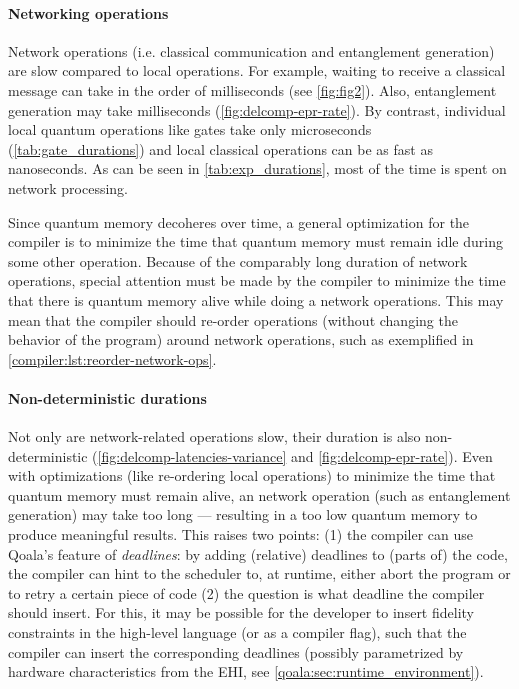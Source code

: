 \paragraph{Networking operations}
Network operations (i.e. classical communication and entanglement generation) are slow compared to local operations.
For example, waiting to receive a classical message can take in the order of milliseconds (see \cref{fig:fig2}).
Also, entanglement generation may take milliseconds (\cref{fig:delcomp-epr-rate}).
By contrast, individual local quantum operations like gates take only microseconds (\cref{tab:gate_durations}) and local classical operations can be as fast as nanoseconds.
As can be seen in \cref{tab:exp_durations}, most of the time is spent on network processing.

Since quantum memory decoheres over time, a general optimization for the compiler is to minimize the time that quantum memory must remain idle during some other operation.
Because of the comparably long duration of network operations, special attention must be made by the compiler to minimize the time that there is quantum memory alive while doing a network operations.
This may mean that the compiler should re-order operations (without changing the behavior of the program) around network operations, such as exemplified in \cref{compiler:lst:reorder-network-ops}.

\paragraph{Non-deterministic durations}
Not only are network-related operations slow, their duration is also non-deterministic (\cref{fig:delcomp-latencies-variance} and \cref{fig:delcomp-epr-rate}).
Even with optimizations (like re-ordering local operations) to minimize the time that quantum memory must remain alive, an network operation (such as entanglement generation) may take too long --- resulting in a too low quantum memory to produce meaningful results.
This raises two points:
(1) the compiler can use Qoala's feature of \emph{deadlines}: by adding (relative) deadlines to (parts of) the code, the compiler can hint to the scheduler to, at runtime, either abort the program or to retry a certain piece of code
(2) the question is what deadline the compiler should insert. For this, it may be possible for the developer to insert fidelity constraints in the high-level language (or as a compiler flag), such that the compiler can insert the corresponding deadlines (possibly parametrized by hardware characteristics from the \acf{EHI}, see \cref{qoala:sec:runtime_environment}).

